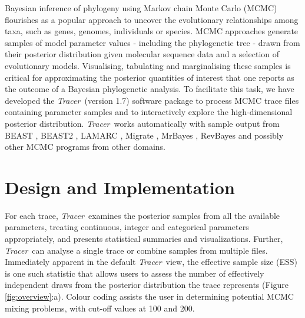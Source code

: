 \documentclass{bioinfo_tracer}
\newcommand{\tracer}{\emph{Tracer}}
\begin{document}
Bayesian inference of phylogeny using Markov chain Monte Carlo (MCMC) \citep{rannala1996probability, mau1999bayesian, drummond2002estimating} flourishes as a popular approach to uncover the evolutionary relationships among taxa, such as genes, genomes, individuals or species.
MCMC approaches generate samples of model parameter values - including the phylogenetic tree - drawn from their posterior distribution given molecular sequence data and a selection of evolutionary models.
Visualising, tabulating and marginalising these samples is critical for approximating the posterior quantities of interest that one reports as the outcome of a Bayesian phylogenetic analysis.
To facilitate this task, we have developed the \tracer\ (version 1.7) software package to
process MCMC trace files containing parameter samples and to interactively explore the high-dimensional posterior distribution.
\tracer\ works automatically with sample output from BEAST \citep{drummond2012bayesian}, BEAST2 \citep{bouckaert2014beast2},  LAMARC \citep{kuhner2006lamarc},  Migrate \citep{beerli2006comparison}, MrBayes \citep{ronquist2012mrbayes}, RevBayes \citep{hohna2016revbayes} and possibly other MCMC programs from other domains.

\section*{Design and Implementation}

For each trace, \tracer\ examines the posterior samples from all the available parameters, treating continuous, integer and categorical parameters appropriately, and presents statistical summaries and visualizations.
Further, \tracer\ can analyse a single trace or combine samples from multiple files.
Immediately apparent in the default \tracer\ view, the effective sample size (ESS) is one such statistic that
allows users to assess the number of effectively independent draws from the posterior distribution the trace represents (Figure \ref{fig:overview}:a).
Colour coding assists the user in determining potential MCMC mixing problems, with cut-off values at 100 and 200.
\end{document}
